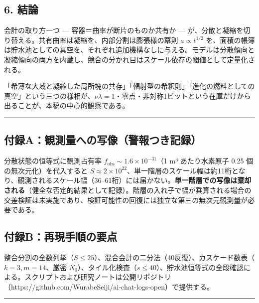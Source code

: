 \documentclass[
]{ltjsarticle}
\begin{document}
\subsection{6. 結論}\label{ux7d50ux8ad6}

会計の取り方一つ --- 容器＝曲率が断片のものか共有か ---
が、分散と凝縮を切り替える。共有曲率は凝縮を、内部分割は膨張様の冪則
\(a\propto t^{1/2}\)
を、面積の帳簿は貯水池としての真空を、それぞれ追加機構なしに与える。モデルは分散傾向と凝縮傾向の両方を内蔵し、競合の分かれ目はスケール依存の閾値として定量化される。

「希薄な大域と凝縮した局所塊の共存」「輻射型の希釈則」「進化の燃料としての真空」という三つの様相が、\(\nu\lambda=1\)・零点・非対称1ビットという在庫だけから出ることが、本稿の中心的観察である。

\begin{center}\rule{0.5\linewidth}{0.5pt}\end{center}

\subsection{付録A：観測量への写像（警報つき記録）}\label{ux4ed8ux9332aux89b3ux6e2cux91cfux3078ux306eux5199ux50cfux8b66ux5831ux3064ux304dux8a18ux9332}

分散状態の恒等式に観測占有率
\(f_{\mathrm{obs}}\sim1.6\times10^{-31}\)（1 m³ あたり水素原子 0.25
個の無次元化）を代入すると
\(S\approx2\times10^{22}\)、単一階層のスケール幅は約11桁となり、観測されるスケール幅（36--61桁）には届かない。\textbf{単一階層での写像は棄却される}（健全な否定的結果として記録）。階層の入れ子で幅が乗算される場合の交差検証は未実施であり、検証可能性の回復には独立な第三の無次元観測量が必要である。

\subsection{付録B：再現手順の要点}\label{ux4ed8ux9332bux518dux73feux624bux9806ux306eux8981ux70b9}

整合分割の全数列挙（\(S\le25\)）、混合会計の二分法（40反復）、カスケード数表（\(k=3,m=14\)、厳密
\(N_0\)）、タイル化検査（\(s\le40\)）、貯水池恒等式の全段確認による。スクリプトおよび研究ノートは公開リポジトリ（https://github.com/WurabeSeiji/ai-chat-logs-open）で提供する。

\begin{center}\rule{0.5\linewidth}{0.5pt}\end{center}
\end{document}
